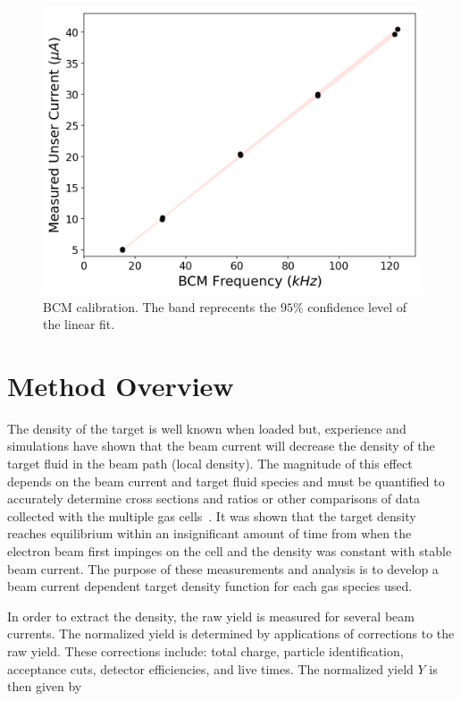 \documentclass[final,5p,times,twocolumn]{elsarticle}
\begin{document}
\begin{figure}[!h]
      \centering
    \includegraphics[width=\linewidth]{images/dnew_calibration.pdf}
    \caption{BCM calibration. The band reprecents the $95\%$ confidence level of the linear fit.}
    \label{fig:dnew_cal}
\end{figure}


\section{Method Overview}

The density of the target is well known when loaded but, experience and simulations have shown that the beam current will 
decrease the density of the target fluid in the beam path (local density). The magnitude of this effect depends on the 
beam current and target fluid species and must be quantified to accurately determine cross sections and ratios or 
other comparisons of data collected with the multiple gas cells~\cite{celldes}. 
It was shown that the target density reaches equilibrium within an insignificant amount of time from when the 
electron beam first impinges on the cell and the density was constant with stable beam current. The purpose of 
these measurements and analysis is to develop a beam current dependent target density function for each gas species used.  

In order to extract the density, the raw yield is measured for several beam currents. The normalized yield is 
determined by applications of corrections  to the raw yield. These corrections include: total charge, 
particle identification, acceptance cuts, detector efficiencies, and live times. The normalized yield $Y$ is then given by
\end{document}
